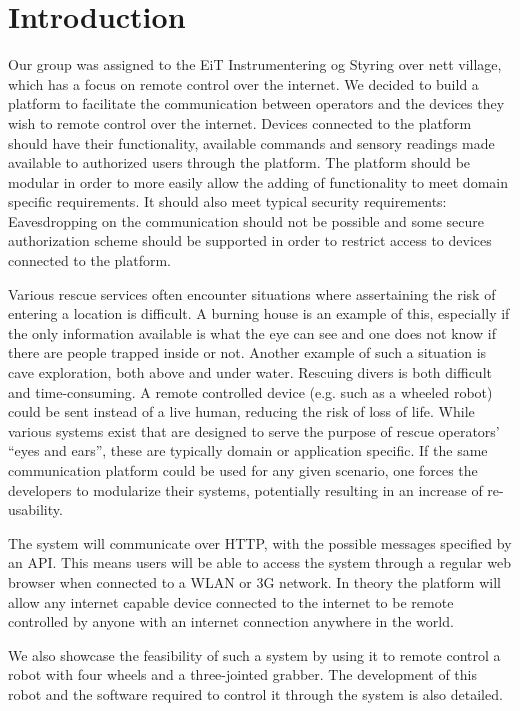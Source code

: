 \chapter{Introduction}
Our group was assigned to the EiT Instrumentering og Styring over nett village, which has a focus on remote control over the internet.
We decided to build a platform to facilitate the communication between operators and the devices they wish to remote control over the internet.
Devices connected to the platform should have their functionality, available commands and sensory readings made available to authorized users through the platform.
The platform should be modular in order to more easily allow the adding of functionality to meet domain specific requirements.
It should also meet typical security requirements: Eavesdropping on the communication should not be possible and some secure authorization scheme should be supported in order to restrict access to devices connected to the platform.

Various rescue services often encounter situations where assertaining the risk of entering a location is difficult. A burning house is an example of this, especially if the only information available is what the eye can see and one does not know if there are people trapped inside or not.
Another example of such a situation is cave exploration, both above and under water.
Rescuing divers is both difficult and time-consuming.  %
A remote controlled device (e.g. such as a wheeled robot) could be sent instead of a live human, reducing the risk of loss of life.
While various systems exist that are designed to serve the purpose of rescue operators' ``eyes and ears'', these are typically domain or application specific.
If the same communication platform could be used for any given scenario, one forces the developers to modularize their systems, potentially resulting in an increase of re-usability.


The system will communicate over HTTP, with the possible messages specified by an API.
This means users will be able to access the system through a regular web browser when connected to a WLAN or 3G network.
In theory the platform will allow any internet capable device connected to the internet to be remote controlled by anyone with an internet connection anywhere in the world.

We also showcase the feasibility of such a system by using it to remote control a robot with four wheels and a three-jointed grabber.
The development of this robot and the software required to control it through the system is also detailed.
